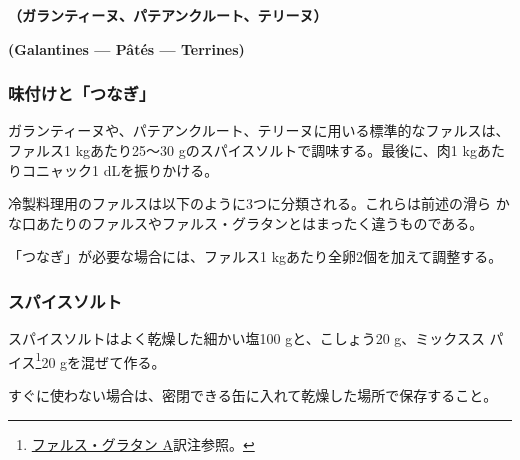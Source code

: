 \vspace{-1.5\zw}
\begin{center}
\textbf{（ガランティーヌ、パテアンクルート、テリーヌ）}
\end{center}
\vspace{.5\zw}
\begin{center}
\vspace{-1\zw}
\hspace{1\zw}\textbf{(Galantines --- Pâtés --- Terrines)}
\end{center}


\normalfont
\begin{recette}
\hypertarget{assaisonnement-et-liaison}{%
\subsubsection{味付けと「つなぎ」}\label{assaisonnement-et-liaison}}


ガランティーヌや、パテアンクルート、テリーヌに用いる標準的なファルスは、
ファルス1 kgあたり25〜30 gのスパイスソルトで調味する。最後に、肉1 kgあた
りコニャック1\undemi{} dLを振りかける。

冷製料理用のファルスは以下のように3つに分類される。これらは前述の滑ら
かな口あたりのファルスやファルス・グラタンとはまったく違うものである。

「つなぎ」が必要な場合には、ファルス1 kgあたり全卵2個を加えて調整する。

\hypertarget{sel-epice}{%
\subsubsection{スパイスソルト}\label{sel-epice}}


 

スパイスソルトはよく乾燥した細かい塩100 gと、こしょう20 g、ミックスス
パイス\footnote{\protect\hyperlink{farce-gratin-a}{ファルス・グラタン
  A}訳注参照。}20 gを混ぜて作る。

すぐに使わない場合は、密閉できる缶に入れて乾燥した場所で保存すること。

\hypertarget{farce-froide-a}{%
}
\end{recette}
